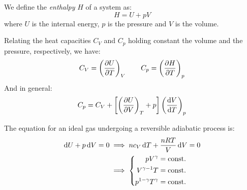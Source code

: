 \documentclass[../../../main_physics.tex]{subfiles}
\begin{document}
\begin{multicols}{2}
\begin{definition}
  \end{definition}
  \begin{definition}[Enthalpy]
    We define the \emph{enthalpy} $H$ of a system as: $$H=U+pV$$
    where $U$ is the internal energy, $p$ is the pressure and $V$ is the volume.
  \end{definition}
  \begin{proposition}
    Relating the heat capacities $C_V$ and $C_p$ holding constant the volume and the pressure, respectively, we have:
    $$C_V=\left(\pdv{U}{T}\right)_V\qquad C_p=\left(\pdv{H}{T}\right)_p$$
    And in general:
    $$C_p=C_V+\left[\left(\pdv{U}{V}\right)_T+p\right]\left(\dv{V}{T}\right)_p$$
  \end{proposition}
  \begin{proposition}
    The equation for an ideal gas undergoing a reversible adiabatic process is:
    \begin{align*}
      \dd{U}+p\dd{V}=0 & \implies nc_V\dd{T}+\frac{nRT}{V}\dd{V}=0 \\
                       & \implies\left\{
      \begin{aligned}
        pV^\gamma            & =\text{const.} \\
        V^{\gamma-1} T       & =\text{const.} \\
        p^{1-\gamma}T^\gamma & =\text{const.}
      \end{aligned}\right.
    \end{align*}
  \end{proposition}

\end{multicols}
\end{document}
